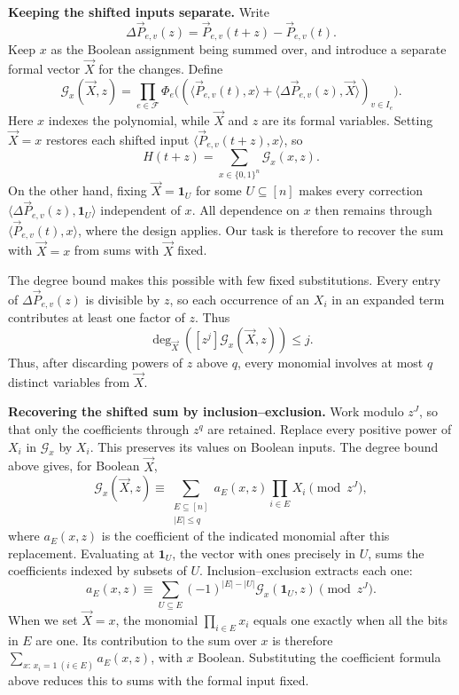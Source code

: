 \documentclass[11pt,reqno]{amsart}
\numberwithin{equation}{section}
\theoremstyle{definition}\newtheorem{definition}[theorem]{Definition}
\theoremstyle{remark}\newtheorem{remark}[theorem]{Remark}
\renewcommand{\le}{\leqslant}
\begin{document}
\smallskip\noindent
\textbf{Keeping the shifted inputs separate.}
Write
\[
 \Delta\vec P_{e,v}(z)=\vec P_{e,v}(t+z)-\vec P_{e,v}(t).
\]
Keep $x$ as the Boolean assignment being summed over, and introduce
a separate formal vector $\vec X$ for the changes. Define
\begin{equation}\label{eq:outline-taylor-product}
 \mathcal G_x(\vec X,z)=
 \prod_{e\in\mathcal F}\Phi_e\bigl(
       (\langle\vec P_{e,v}(t),x\rangle+
        \langle\Delta\vec P_{e,v}(z),\vec X\rangle)_{v\in I_e}\bigr).
\end{equation}
Here $x$ indexes the polynomial, while $\vec X$ and $z$ are its
formal variables. Setting $\vec X=x$ restores each shifted input
$\langle\vec P_{e,v}(t+z),x\rangle$, so
\[
 H(t+z)=\sum_{x\in\{0,1\}^n}\mathcal G_x(x,z).
\]
On the other hand, fixing $\vec X=\mathbf1_U$ for some
$U\subseteq[n]$ makes every correction
$\langle\Delta\vec P_{e,v}(z),\mathbf1_U\rangle$ independent of $x$.
All dependence on $x$ then remains through
$\langle\vec P_{e,v}(t),x\rangle$, where the design applies.
Our task is therefore to recover the sum with $\vec X=x$
from sums with $\vec X$ fixed.

The degree bound makes this possible with few fixed substitutions.
Every entry of $\Delta\vec P_{e,v}(z)$ is divisible by $z$, so
each occurrence of an $X_i$ in an expanded term contributes at
least one factor of $z$. Thus
\[
 \deg_{\vec X}([z^j]\mathcal G_x(\vec X,z))\le j.
\]
Thus, after discarding powers of $z$ above $q$, every monomial
involves at most $q$ distinct variables from $\vec X$.

\smallskip\noindent
\textbf{Recovering the shifted sum by inclusion--exclusion.}
Work modulo $z^J$, so that only the coefficients through $z^q$
are retained. Replace every positive power of $X_i$ in
$\mathcal G_x$ by $X_i$. This preserves its values on Boolean
inputs. The degree bound above gives, for Boolean $\vec X$,
\[
 \mathcal G_x(\vec X,z)\equiv
 \sum_{\substack{E\subseteq[n]\\|E|\le q}}
       a_E(x,z)\prod_{i\in E}X_i\pmod{z^J},
\]
where $a_E(x,z)$ is the coefficient of the indicated monomial
after this replacement. Evaluating at $\mathbf1_U$, the vector
with ones precisely in $U$, sums the coefficients indexed by
subsets of $U$. Inclusion--exclusion extracts each one:
\[
 a_E(x,z)\equiv
 \sum_{U\subseteq E}(-1)^{|E|-|U|}
                 \mathcal G_x(\mathbf1_U,z)\pmod{z^J}.
\]
When we set $\vec X=x$, the monomial $\prod_{i\in E}x_i$
equals one exactly when all the bits in $E$ are one.
Its contribution to the sum over $x$ is therefore
$\sum_{x:\,x_i=1\ (i\in E)}a_E(x,z)$, with $x$ Boolean.
Substituting the coefficient formula above reduces this to sums
with the formal input fixed.
\end{document}
